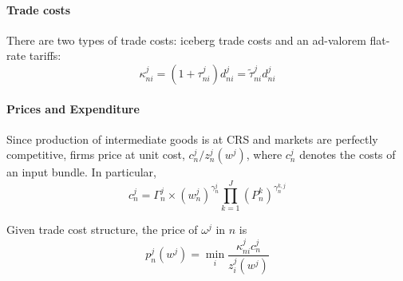 \paragraph{Trade costs}
There are two types of trade costs: iceberg trade costs and an ad-valorem flat-rate tariffs:
\begin{equation}
    \kappa_{ni}^j = (1 + \tau_{ni}^j) d_{ni}^j = \tilde{\tau}_{ni}^j d_{ni}^j 
\end{equation}


\paragraph{Prices and Expenditure}
Since production of intermediate goods is at CRS and markets are perfectly competitive,
firms price at unit cost, $c_n^j / z_n^j(w^j)$,
where $c_n^j$ denotes the costs of an input bundle.
In particular,
\begin{equation}
    c_n^j = \Gamma_n^j \times (w_n^j)^{\gamma_n^j} \prod_{k=1}^J (P_{n}^k)^{\gamma_n^{k,j}}
\end{equation}

Given trade cost structure, the price of $\omega^j$ in $n$ is 
\begin{equation}
    p_n^j(w^j) = \min_i \frac{\kappa_{ni}^j c_n^j}{z_i^j(w^j)}
\end{equation}